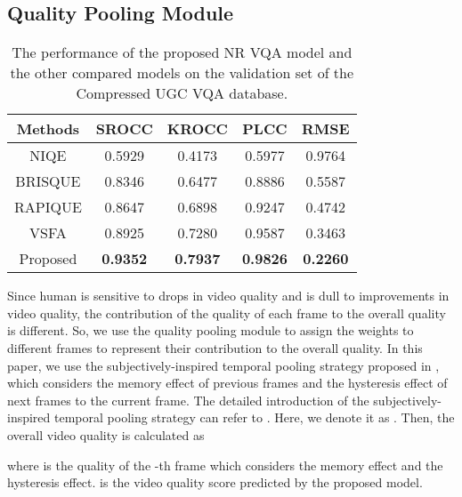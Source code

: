 \documentclass{article}
\begin{document}
\subsection{Quality Pooling Module}

\begin{table}
	\small
\centering
	\renewcommand{\arraystretch}{1.15}
	\caption{The performance of the proposed NR VQA model and the other compared models on the validation set of the Compressed UGC VQA database.}
	\label{NR_Compressed}
\begin{tabular}{c|cccc}
		\toprule[.15em]
		
		Methods & SROCC & KROCC & PLCC & RMSE   \\
		\hline
		NIQE \cite{mittal2012making}     &0.5929  &0.4173  & 0.5977  &0.9764 \\
		
		BRISQUE \cite{mittal2012no}  &0.8346  &0.6477  &0.8886 &0.5587 \\
		
		RAPIQUE \cite{tu2021rapique}  &0.8647  &0.6898  &0.9247&0.4742 \\
		
		VSFA \cite{li2019quality} &0.8925  &0.7280  &0.9587 &0.3463   \\
		
		Proposed    & \textbf{0.9352} 	&\textbf{ 0.7937} 	&\textbf{0.9826} 	&\textbf{0.2260} \\
		
		\bottomrule[.15em]
		
	\end{tabular}	


\end{table}

Since human is sensitive to drops in video quality and is dull to improvements in video quality, the contribution of the quality of each frame to the overall quality is different. So, we use the quality pooling module to assign the weights to different frames to represent their contribution to the overall quality. In this paper, we use the subjectively-inspired temporal pooling strategy proposed in \cite{li2019quality}, which considers the memory effect of previous frames and the hysteresis effect of next frames to the current frame. The detailed introduction of the subjectively-inspired temporal pooling strategy can refer to \cite{li2019quality}. Here, we denote it as .
Then, the overall video quality is calculated as

where  is the quality of the -th frame which considers the memory effect and the hysteresis effect.  is the video quality score predicted by the proposed model.
\end{document}
